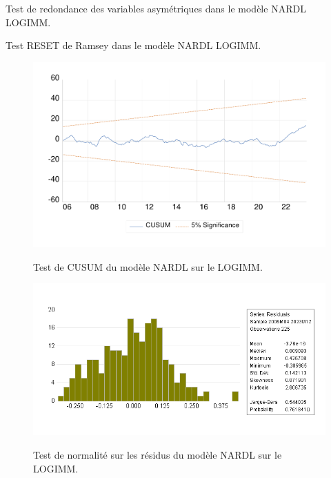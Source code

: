 \begin{table}[H]
    \centering
    \sffamily
    \caption{Test de redondance des variables asymétriques dans le modèle NARDL LOGIMM.}
    \label{tab:redondance_nardl_logimm}
    \resizebox{1\textwidth}{!}{}
\end{table}

\begin{table}[H]
    \centering
    \sffamily
    \caption{Test RESET de Ramsey dans le modèle NARDL LOGIMM.}
    \label{tab:reset_nardl_logimm}
    \resizebox{1\textwidth}{!}{}
\end{table}

\begin{figure}[H]
    \centering
    \caption{Test de CUSUM du modèle NARDL sur le LOGIMM.}
    \includegraphics[scale=0.9]{annexes/cusum_nardl_logimm.pdf}
    \label{fig:msih_resids}
\end{figure}

\begin{figure}[H]
    \centering
    \caption{Test de normalité sur les résidus du modèle NARDL sur le LOGIMM.}
    \includegraphics[scale=0.8]{annexes/normality_nardl_logimm.png}
    \label{fig:normalite_nardl_logimm}
\end{figure}

